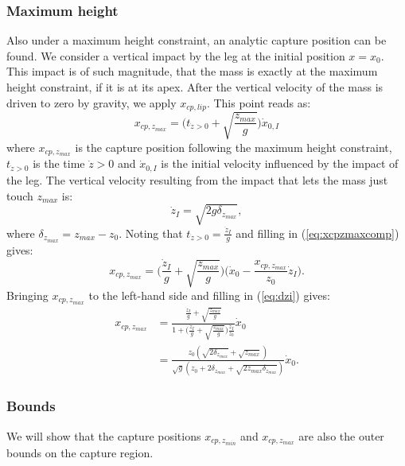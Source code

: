 \documentclass[letterpaper, 10 pt, conference]{ieeeconf}  %
\newcommand{\zmin}{z_{min}}
\newcommand{\zmax}{z_{max}}
\begin{document}
\subsubsection{Maximum height} Also under a maximum height constraint, an analytic capture position can be found. We consider a vertical impact by the leg at the initial position $x=x_0$. This impact is of such magnitude, that the mass is exactly at the maximum height constraint, if it is at its apex. After the vertical velocity of the mass is driven to zero by gravity, we apply $x_{cp,lip}$. This point reads as:
\begin{equation}
	x_{cp,\zmax} =\bigg(t_{\dot{z}>0} + \sqrt{\frac{\zmax}{g}}\bigg)\dot{x}_{0,I}
	\label{eq:xcpzmaxcomp}
\end{equation} 
where $x_{cp,\zmax}$ is the capture position following the maximum height constraint, $t_{\dot{z}>0}$ is the time $\dot{z}>0$ and $\dot{x}_{0,I}$ is the initial velocity influenced by the impact of the leg. The vertical velocity resulting from the impact that lets the mass just touch $\zmax$ is:
\begin{equation}
	\dot{z}_{I} = \sqrt{2g\delta_{\zmax}},
	\label{eq:dzi}
\end{equation}
where $\delta_{\zmax}=\zmax-z_0$. Noting that $t_{\dot{z}>0} = \frac{\dot{z}_I}{g}$ and filling in (\ref{eq:xcpzmaxcomp}) gives:
\begin{equation}
	x_{cp,\zmax} = \bigg(\frac{\dot{z}_I}{g}+\sqrt{\frac{\zmax}{g}}\bigg)\bigg(\dot{x}_0-\frac{x_{cp,\zmax}}{z_0}\dot{z}_I\bigg).
\end{equation}
Bringing $x_{cp,\zmax}$ to the left-hand side and filling in (\ref{eq:dzi}) gives:
\begin{align}
	x_{cp,\zmax}&=\frac{\frac{\dot{z}_I}{g}+\sqrt{\frac{z_{max}}{g}}}{1+\Big(\frac{\dot{z}_I}{g}+\sqrt{\frac{z_{max}}{g}}\Big)\frac{\dot{z}_I}{z_0}}\dot{x}_0\\
	&=\frac{z_0(\sqrt{2\delta_{\zmax}}+\sqrt{\zmax})}{\sqrt{g}(z_0 + 2\delta_{\zmax} + \sqrt{2\zmax \delta_{\zmax}})}\dot{x}_0.
\end{align}
\subsubsection{Bounds} We will show that the capture positions $x_{cp,\zmin}$ and $x_{cp,\zmax}$ are also the outer bounds on the capture region.
\end{document}
